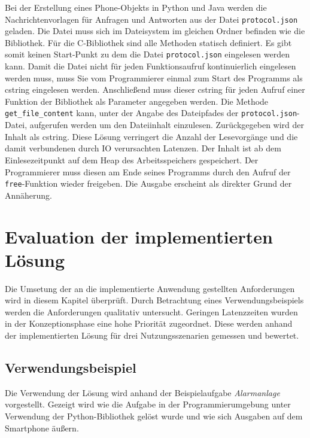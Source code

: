 \documentclass[11pt,a4paper]{report}
\begin{document}
Bei der Erstellung eines Phone-Objekts in Python und Java werden die Nachrichtenvorlagen für Anfragen und Antworten aus der Datei \texttt{protocol.json} geladen.
Die Datei muss sich im Dateisystem im gleichen Ordner befinden wie die Bibliothek.
Für die C-Bibliothek sind alle Methoden statisch definiert.
Es gibt somit keinen Start-Punkt zu dem die Datei \texttt{protocol.json} eingelesen werden kann.
Damit die Datei nicht für jeden Funktionsaufruf kontinuierlich eingelesen werden muss, muss Sie vom Programmierer einmal zum Start des Programms als cstring eingelesen werden.
Anschließend muss dieser cstring für jeden Aufruf einer Funktion der Bibliothek als Parameter angegeben werden.
Die Methode \texttt{get\_file\_content} kann, unter der Angabe des Dateipfades der \texttt{protocol.json}-Datei, aufgerufen werden um den Dateiinhalt einzulesen.
Zurückgegeben wird der Inhalt als cstring.
Diese Lösung verringert die Anzahl der Lesevorgänge und die damit verbundenen durch IO verursachten Latenzen.
Der Inhalt ist ab dem Einlesezeitpunkt auf dem Heap des Arbeitsspeichers gespeichert.
Der Programmierer muss diesen am Ende seines Programms durch den Aufruf der \texttt{free}-Funktion wieder freigeben.
Die Ausgabe erscheint als direkter Grund der Annäherung.


\chapter{Evaluation der implementierten Lösung}\label{chap:eval}
Die Umsetung der an die implementierte Anwendung gestellten Anforderungen wird in diesem Kapitel überprüft.
Durch Betrachtung eines Verwendungsbeispiels werden die Anforderungen qualitativ untersucht.
Geringen Latenzzeiten wurden in der Konzeptionsphase eine hohe Priorität zugeordnet.
Diese werden anhand der implementierten Lösung für drei Nutzungsszenarien gemessen und bewertet.


\section{Verwendungsbeispiel}
Die Verwendung der Lösung wird anhand der Beispielaufgabe \textit{Alarmanlage} vorgestellt.
Gezeigt wird wie die Aufgabe in der Programmierumgebung unter Verwendung der Python-Bibliothek gelöst wurde und wie sich Ausgaben auf dem Smartphone äußern.
\end{document}
